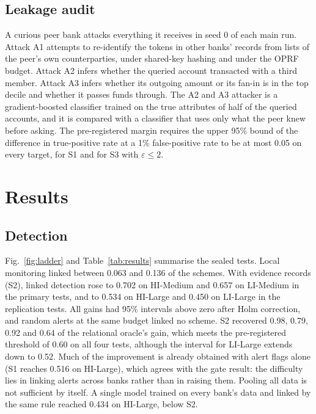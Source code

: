 \documentclass[conference]{IEEEtran}
\begin{document}
\subsection{Leakage audit}
A curious peer bank attacks everything it receives in seed 0 of each main run. Attack A1 attempts
to re-identify the tokens in other banks' records from lists of the peer's own
counterparties, under shared-key hashing and under the OPRF budget. Attack A2 infers whether
the queried account transacted with a third member. Attack A3 infers whether its outgoing
amount or its fan-in is in the top decile and whether it passes funds through. The A2 and A3
attacker is a gradient-boosted classifier trained on the true attributes of half of the
queried accounts, and it is compared with a classifier that uses only what the peer knew
before asking. The pre-registered margin requires the upper 95\% bound of the difference in
true-positive rate at a 1\% false-positive rate to be at most 0.05 on every target, for S1
and for S3 with $\varepsilon \leq 2$.

\section{Results}\label{sec:results}

\subsection{Detection}
Fig.~\ref{fig:ladder} and Table~\ref{tab:results} summarise the sealed tests. Local
monitoring linked between 0.063 and 0.136 of the schemes. With evidence records (S2), linked
detection rose to 0.702 on HI-Medium and 0.657 on LI-Medium in the primary tests, and to
0.534 on HI-Large and 0.450 on LI-Large in the replication tests. All gains had 95\% intervals
above zero after Holm correction, and random alerts at the same budget linked no scheme. S2
recovered 0.98, 0.79, 0.92 and 0.64 of the relational oracle's gain, which meets the
pre-registered threshold of 0.60 on all four tests, although the interval for LI-Large
extends down to 0.52. Much of the improvement is already obtained with alert flags alone
(S1 reaches 0.516 on HI-Large), which agrees with the gate result: the difficulty lies in
linking alerts across banks rather than in raising them. Pooling all data is not sufficient
by itself. A single model trained on every bank's data and linked by the same rule reached
0.434 on HI-Large, below S2.
\end{document}
